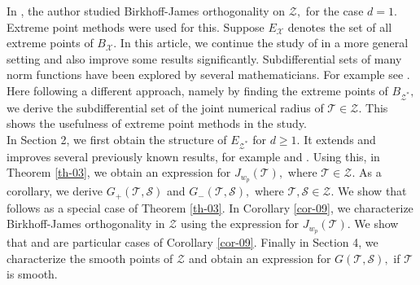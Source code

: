 \documentclass{amsart}
\theoremstyle{definition}
\theoremstyle{remark}
\numberwithin{equation}{section}
\begin{document}
 In \cite{M2}, the author studied Birkhoff-James orthogonality on $\mathcal{Z},$ for the case $d=1.$ Extreme point methods were used for this. Suppose $E_{\mathcal{X}}$ denotes the set of all extreme points of $B_{\mathcal{X}}.$
 In this article, we continue the study of \cite{GS,M2} in a more general setting and also improve some results significantly. Subdifferential sets of many norm functions have  been explored by several mathematicians. For example see \cite{GS,G,W,Z}. Here following a different approach, namely by finding the extreme points of $B_{\mathcal{Z}^*},$ we derive the subdifferential set of the joint numerical radius of $\mathcal{T}\in \mathcal{Z}.$ This shows the usefulness of extreme point methods in the study.  \\
 
 In Section 2, we first obtain the structure of $E_{\mathcal{Z^*}}$ for $d\geq 1.$ It extends and improves several previously known results, for example \cite[Th. 2.1 \& Th. 2.3]{M2} and \cite[Th. 4.6]{DMP}.   Using this, in Theorem \ref{th-03}, we obtain an expression for $J_{w_p}(\mathcal{T}),$ where $\mathcal{T}\in \mathcal{Z}.$ As a corollary, we derive $G_+(\mathcal{T},\mathcal{S})$ and $G_-(\mathcal{T},\mathcal{S}),$ where $\mathcal{T},\mathcal{S}\in \mathcal{Z}.$ We show that \cite[Th. 1.1]{GS} follows as a special case of Theorem \ref{th-03}. In Corollary \ref{cor-09}, we characterize Birkhoff-James orthogonality in $\mathcal{Z}$ using the expression for $J_{w_p}(\mathcal{T}).$ We show that \cite[Th. 1.2 \& Th. 1.3]{GS} and \cite[Th. 3.1]{M2} are particular cases of Corollary \ref{cor-09}. Finally in Section 4, we characterize the smooth points of $\mathcal{Z}$ and obtain an expression for $G(\mathcal{T},\mathcal{S}),$ if $\mathcal{T}$ is smooth. 
\end{document}
